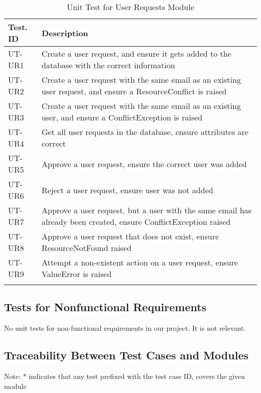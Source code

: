 \documentclass[12pt, titlepage]{article}
\begin{document}
\begin{longtable}{|m{2cm}|m{10cm}|}
  \hline
  \textbf{Test. ID} & \textbf{Description}\\ \hline
  UT-UR1 & Create a user request, and ensure it gets added to the
  database with the correct information\\ \hline
  UT-UR2 & Create a user request with the same email as an existing
  user request, and ensure a ResourceConflict is raised\\ \hline
  UT-UR3 & Create a user request with the same email as an existing
  user, and ensure a ConflictException is raised \\ \hline
  UT-UR4 & Get all user requests in the database, ensure attributes
  are correct\\ \hline
  UT-UR5 & Approve a user request, ensure the correct user was added\\ \hline
  UT-UR6 & Reject a user request, ensure user was not added\\ \hline
  UT-UR7 & Approve a user request, but a user with the same email has
  already been created, ensure ConflictException raised\\ \hline
  UT-UR8 & Approve a user request that does not exist, ensure
  ResourceNotFound raised\\ \hline
  UT-UR9 & Attempt a non-existent action on a user request, ensure
  ValueError is raised\\ \hline
  \caption{Unit Test for User Requests Module}
\end{longtable}

\subsection{Tests for Nonfunctional Requirements}

No unit tests for non-functional requirements in our project. It is
not relevant.

\subsection{Traceability Between Test Cases and Modules}

Note: * indicates that any test prefixed with the test case ID,
covers the given module
\end{document}
